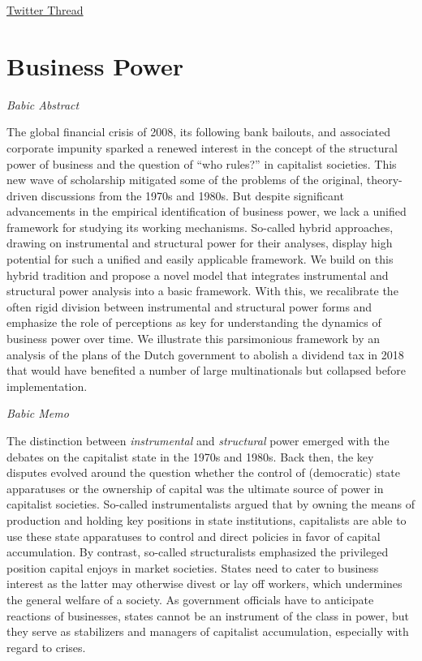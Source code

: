 \documentclass[
]{book}
\begin{document}
\href{https://twitter.com/bookcheekite/status/1460860305270001665}{Twitter Thread}

\hypertarget{business-power}{%
\section{Business Power}\label{business-power}}

\emph{Babic Abstract}

The global financial crisis of 2008, its following bank bailouts, and associated corporate impunity sparked a renewed interest in the concept of the structural power of business and the question of ``who rules?'' in capitalist societies. This new wave of scholarship mitigated some of the problems of the original, theory-driven discussions from the 1970s and 1980s. But despite significant advancements in the empirical identification of business power, we lack a unified framework for studying its working mechanisms. So-called hybrid approaches, drawing on instrumental and structural power for their analyses, display high potential for such a unified and easily applicable framework. We build on this hybrid tradition and propose a novel model that integrates instrumental and structural power analysis into a basic framework. With this, we recalibrate the often rigid division between instrumental and structural power forms and emphasize the role of perceptions as key for understanding the dynamics of business power over time. We illustrate this parsimonious framework by an analysis of the plans of the Dutch government to abolish a dividend tax in 2018 that would have benefited a number of large multinationals but collapsed before implementation.

\emph{Babic Memo}

The distinction between \emph{instrumental} and \emph{structural} power emerged with the debates on the capitalist state in the 1970s and 1980s. Back then, the key disputes evolved around the question whether the control of (democratic) state apparatuses or the ownership of capital was the ultimate source of power in capitalist societies. So-called instrumentalists argued that by owning the means of production and holding key positions in state institutions, capitalists are able to use these state apparatuses to control and direct policies in favor of capital accumulation. By contrast, so-called structuralists emphasized the privileged position capital enjoys in market societies. States need to cater to business interest as the latter may otherwise divest or lay off workers, which undermines the general welfare of a society. As government officials have to anticipate reactions of businesses, states cannot be an instrument of the class in power, but they serve as stabilizers and managers of capitalist accumulation, especially with regard to crises.
\end{document}
